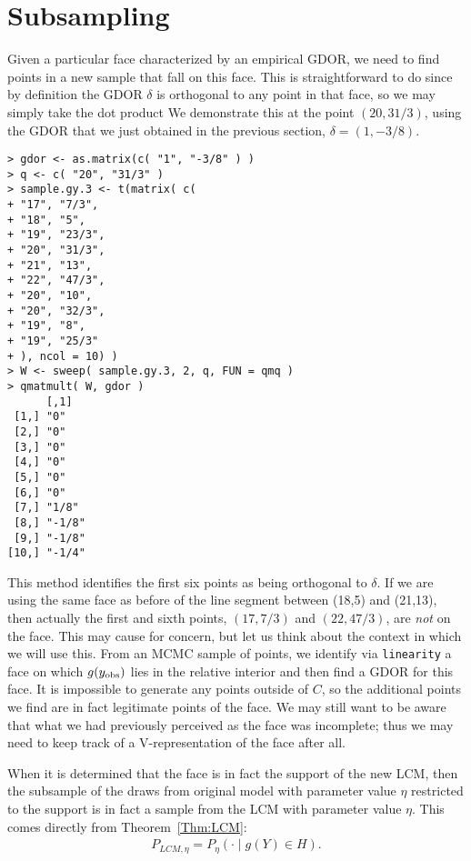 \section{Subsampling}
Given a particular face characterized by an empirical GDOR, we need to
find points in a new sample that fall on this face.  This is straightforward to
do since by definition the GDOR $\delta$ is orthogonal to any point in that face,
so we may simply take the dot product 
We demonstrate this at the point $(20, 31/3)$, using the GDOR that we just 
obtained in the previous section, $\delta = (1, -3/8)$.
\begin{verbatim}
> gdor <- as.matrix(c( "1", "-3/8" ) )
> q <- c( "20", "31/3" )
> sample.gy.3 <- t(matrix( c(
+ "17", "7/3",
+ "18", "5",
+ "19", "23/3",
+ "20", "31/3",
+ "21", "13",
+ "22", "47/3",
+ "20", "10",
+ "20", "32/3",
+ "19", "8",
+ "19", "25/3"
+ ), ncol = 10) )
> W <- sweep( sample.gy.3, 2, q, FUN = qmq )
> qmatmult( W, gdor )
      [,1]  
 [1,] "0"   
 [2,] "0"   
 [3,] "0"   
 [4,] "0"   
 [5,] "0"   
 [6,] "0"   
 [7,] "1/8" 
 [8,] "-1/8"
 [9,] "-1/8"
[10,] "-1/4"
\end{verbatim}
This method identifies the first six points as being orthogonal to $\delta$.
If we are using the same face as before of the line segment between (18,5) and (21,13), 
then actually the first and sixth points, $(17, 7/3)$ and $(22,47/3)$, 
are \emph{not} on the face.  This may cause for concern, but let us 
think about the context in which we will use this.  From an MCMC sample of points,
we identify via \texttt{linearity} a face on which $g(y_{\text{obs}})$ lies in the relative
interior and then find a GDOR for this face.  It is impossible to generate any
points outside of $C$, so the additional points we find are in fact legitimate 
points of the face.  We may still want to be aware that what we had previously
perceived as the face was incomplete; thus we may need to keep track of a 
V-representation of the face after all.

When it is determined that the face is in fact the support of the new LCM,
then the subsample of the draws from original model with parameter value $\eta$ 
restricted to the support is in fact a sample from the LCM with parameter value $\eta$.  
This comes directly from Theorem~\ref{Thm:LCM}: 
\begin{align*}
P_{LCM, \eta} = P_\eta( \cdot \mid g(Y) \in H ).
\end{align*}


